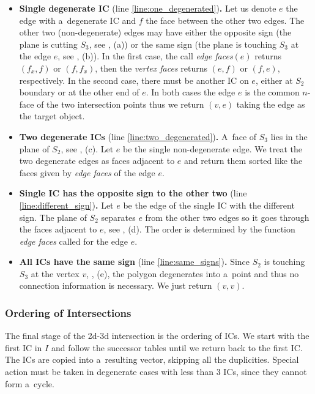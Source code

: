 \begin{itemize}
 \item {\bf Single degenerate IC} (line \ref{line:one_degenerated}){\bf .} Let us denote $e$ the edge with a~degenerate IC 
 and $f$ the face between the other two edges.
 The other two (non-degenerate) edges may have either the opposite sign (the plane is cutting $S_3$, see , (a)) 
 or the same sign (the plane is touching $S_3$ at the edge $e$, see , (b)).
 In the first case, the call \emph{edge faces}$(e)$ returns $(f_x,f)$ or $(f,f_x)$, then the \emph{vertex faces} returns $(e, f)$ or $(f, e)$, respectively.
 In the second case,  there must be another IC on $e$, either at $S_2$ boundary or at the other end of $e$.
 In both cases the edge $e$ is the common $n$-face of the two intersection points thus we return 
 $(v,e)$ taking the edge as the target object.

 
 \item {\bf Two degenerate ICs} (line \ref{line:two_degenerated}){\bf .} A~face of $S_3$ lies in the plane of $S_2$,
 see , (c). 
 Let $e$ be the single non-degenerate edge. We treat the two degenerate edges as faces adjacent to $e$ 
 and return them sorted like the faces given by \emph{edge faces} of the edge $e$.
 
 
 \item {\bf Single IC has the opposite sign to the other two} (line \ref{line:different_sign}){\bf .} 
 Let $e$ be the edge of the single IC with the different sign. 
 The plane of $S_2$ separates $e$ from the other two edges so it goes through the faces adjacent to $e$,
 see , (d).
 The order is determined by the function \emph{edge faces} called for the edge $e$.

 \item {\bf All ICs have the same sign} (line \ref{line:same_signs}){\bf .} Since $S_2$ is touching $S_3$ 
 at the vertex $v$, , (e), the polygon degenerates into a~point and thus no connection information is necessary.
 We just return $(v,v)$.
\end{itemize}

\subsubsection{Ordering of Intersections}
The final stage of the 2d-3d intersection is the ordering of ICs. We start with the first IC in $I$ and follow the 
successor tables until we return back to the first IC. The ICs are copied into a~resulting vector, skipping all the duplicities.
Special action must be taken in degenerate cases with less than $3$ ICs, since they cannot form a~cycle.


